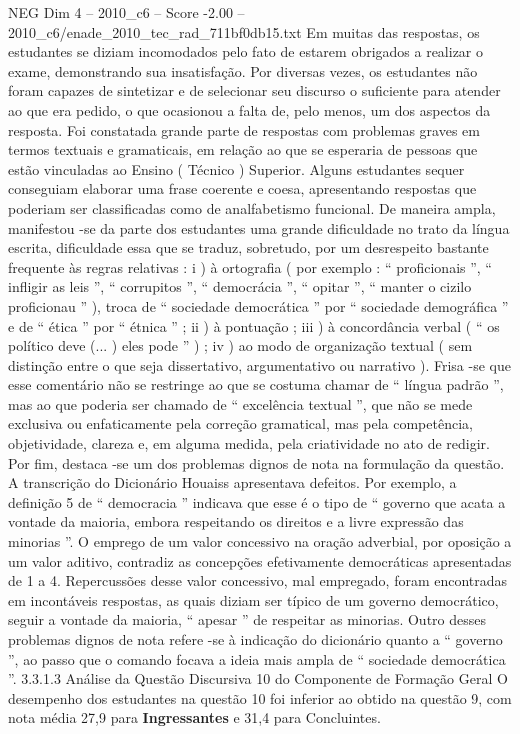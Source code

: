 \begin{textsample}{NEG Dim 4 – 2010\_c6 – Score -2.00 – 2010\_c6/enade\_2010\_tec\_rad\_711bf0db15.txt}
Em muitas das respostas, os estudantes se diziam incomodados pelo fato de estarem obrigados a realizar o exame, demonstrando sua insatisfação.
Por diversas vezes, os estudantes não foram capazes de sintetizar e de selecionar seu discurso o suficiente para atender ao que era pedido, o que ocasionou a falta de, pelo menos, um dos aspectos da resposta.
Foi constatada grande parte de respostas com problemas graves em termos textuais e gramaticais, em relação ao que se esperaria de pessoas que estão vinculadas ao Ensino ( Técnico ) Superior.
Alguns estudantes sequer conseguiam elaborar uma frase coerente e coesa, apresentando respostas que poderiam ser classificadas como de analfabetismo funcional.
De maneira ampla, manifestou -se da parte dos estudantes uma grande dificuldade no trato da língua escrita, dificuldade essa que se traduz, sobretudo, por um desrespeito bastante frequente às regras relativas : i ) à ortografia ( por exemplo : “ proficionais ”, “ infligir as leis ”, “ corrupitos ”, “ democrácia ”, “ opitar ”, “ manter o cizilo proficionau ” ), troca de “ sociedade democrática ” por “ sociedade demográfica ” e de “ ética ” por “ étnica ” ; ii ) à pontuação ; iii ) à concordância verbal ( “ os político deve (... ) eles pode ” ) ; iv ) ao modo de organização textual ( sem distinção entre o que seja dissertativo, argumentativo ou narrativo ).
Frisa -se que esse comentário não se restringe ao que se costuma chamar de “ língua padrão ”, mas ao que poderia ser chamado de “ excelência textual ”, que não se mede exclusiva ou enfaticamente pela correção gramatical, mas pela competência, objetividade, clareza e, em alguma medida, pela criatividade no ato de redigir.
Por fim, destaca -se um dos problemas dignos de nota na formulação da questão.
A transcrição do Dicionário Houaiss apresentava defeitos.
Por exemplo, a definição 5 de “ democracia ” indicava que esse é o tipo de “ governo que acata a vontade da maioria, embora respeitando os direitos e a livre expressão das minorias ”.
O emprego de um valor concessivo na oração adverbial, por oposição a um valor aditivo, contradiz as concepções efetivamente democráticas apresentadas de 1 a 4.
Repercussões desse valor concessivo, mal empregado, foram encontradas em incontáveis respostas, as quais diziam ser típico de um governo democrático, seguir a vontade da maioria, “ apesar ” de respeitar as minorias.
Outro desses problemas dignos de nota refere -se à indicação do dicionário quanto a “ governo ”, ao passo que o comando focava a ideia mais ampla de “ sociedade democrática ”. 3.3.1.3 Análise da Questão Discursiva 10 do Componente de Formação Geral O desempenho dos estudantes na questão 10 foi inferior ao obtido na questão 9, com nota média 27,9 para \textbf{Ingressantes} e 31,4 para Concluintes.

\end{textsample}
